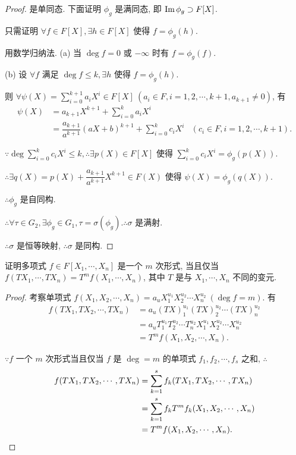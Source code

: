 \documentclass[UTF8]{ctexart}
\begin{document}
\begin{proof}
    是单同态. 下面证明 $\phi_g$ 是满同态, 即 $\operatorname{Im} \phi_g\supset F[X]$.

    只需证明 $\forall f\in F[X],\exists h\in F[X]$ 使得 $f=\phi_g(h)$.

    用数学归纳法. (a) 当 $\deg f=0$ 或 $-\infty$ 时有 $f=\phi_g(f)$.

    (b) 设 $\forall f$ 满足 $\deg f\leq k,\exists h$ 使得 $f=\phi_g(h)$.

    则 $\forall\psi(X)=\sum\limits_{i=0}^{k+1}a_iX^i\in F[X]\ (a_i\in F,i=1,2,\cdots,k+1,a_{k+1}\neq0)$, 有
    \begin{align*}
        \psi(X) & =a_{k+1}X^{k+1}+\sum\limits_{i=0}^{k}a_iX^i \\
        & =\dfrac{a_{k+1}}{a^{k+1}}(aX+b)^{k+1}+\sum\limits_{i=0}^{k}c_iX^i & (c_i\in F,i=1,2,\cdots,k+1).
    \end{align*}

    $\because\deg\sum\limits_{i=0}^{k}c_iX^i\leq k,\therefore\exists p(X)\in F[X]$ 使得 $\sum\limits_{i=0}^{k}c_iX^i=\phi_g(p(X))$.

    $\therefore\exists q(X)=p(X)+\dfrac{a_{k+1}}{a^{k+1}}X^{k+1}\in F(X)$ 使得 $\psi(X)=\phi_g(q(X))$.

    $\therefore\phi_g$ 是自同构.

    $\therefore\forall\tau\in G_2,\exists\phi_g\in G_1,\tau=\sigma(\phi_g).\therefore\sigma$ 是满射.

    $\therefore\sigma$ 是恒等映射, $\therefore\sigma$ 是同构.
\end{proof}
\begin{exercise}%
    证明多项式 $f\in F[X_1,\cdots,X_n]$ 是一个 $m$ 次形式, 当且仅当 $f(TX_1,\cdots,TX_n)=T^mf(X_1,\cdots,X_n)$, 其中 $T$ 是与 $X_1,\cdots,X_n$ 不同的变元.
\end{exercise}
\begin{proof}
    考察单项式 $f(X_1,X_2,\cdots,X_n)=a_uX^{u_1}_1X^{u_2}_2\cdots X^{u_2}_n\ (\deg f=m)$. 有
    \begin{align*}
        f(TX_1,TX_2,\cdots,TX_n) & =a_u(TX)^{u_1}_1(TX)^{u_2}_2\cdots (TX)^{u_2}_n \\
        & =a_uT^{u_1}_1T^{u_2}_2\cdots T^{u_2}_nX^{u_1}_1X^{u_2}_2\cdots X^{u_2}_n \\
        & =T^mf(X_1,X_2,\cdots,X_n).
    \end{align*}

    $\because f$ 一个 $m$ 次形式当且仅当 $f$ 是 $\deg=m$ 的单项式 $f_1,f_2,\cdots,f_s$ 之和, $\therefore$
    \begin{align*}
        f(TX_1,TX_2,\cdots,TX_n) & =\sum\limits_{k=1}^sf_k(TX_1,TX_2,\cdots,TX_n) \\
        & =\sum\limits_{k=1}^sf_kT^mf_k(X_1,X_2,\cdots,X_n) \\
        & =T^mf(X_1,X_2,\cdots,X_n).\qedhere
    \end{align*}
\end{proof}
\end{document}
